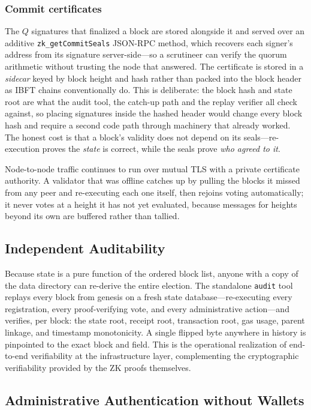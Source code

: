 \subsubsection{Commit certificates}

The $Q$ signatures that finalized a block are stored alongside it and served over an additive \texttt{zk\_getCommitSeals} JSON-RPC method, which recovers each signer's address from its signature server-side---so a scrutineer can verify the quorum arithmetic without trusting the node that answered. The certificate is stored in a \emph{sidecar} keyed by block height and hash rather than packed into the block header as IBFT chains conventionally do. This is deliberate: the block hash and state root are what the audit tool, the catch-up path and the replay verifier all check against, so placing signatures inside the hashed header would change every block hash and require a second code path through machinery that already worked. The honest cost is that a block's validity does not depend on its seals---re-execution proves the \emph{state} is correct, while the seals prove \emph{who agreed to it}.

Node-to-node traffic continues to run over mutual TLS with a private certificate authority. A validator that was offline catches up by pulling the blocks it missed from any peer and re-executing each one itself, then rejoins voting automatically; it never votes at a height it has not yet evaluated, because messages for heights beyond its own are buffered rather than tallied.

\subsection{Independent Auditability}

Because state is a pure function of the ordered block list, anyone with a copy of the data directory can re-derive the entire election. The standalone \texttt{audit} tool replays every block from genesis on a fresh state database---re-executing every registration, every proof-verifying vote, and every administrative action---and verifies, per block: the state root, receipt root, transaction root, gas usage, parent linkage, and timestamp monotonicity. A single flipped byte anywhere in history is pinpointed to the exact block and field. This is the operational realization of end-to-end verifiability at the infrastructure layer, complementing the cryptographic verifiability provided by the ZK proofs themselves.

\subsection{Administrative Authentication without Wallets}\label{sec:no-wallet-auth}

